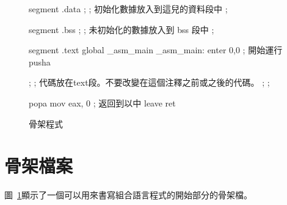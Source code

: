 \begin{figure}[t]
\begin{AsmCodeListing}[label=skel.asm]
segment .data
;
; 初始化數據放入到這兒的資料段中
;

segment .bss
;
; 未初始化的數據放入到 bss 段中
;

segment .text
        global  _asm_main
_asm_main:
        enter   0,0               ; 開始運行
        pusha

;
; 代碼放在text段。不要改變在這個注釋之前或之後的代碼。
;
;

        popa
        mov     eax, 0            ; 返回到以中
        leave
        ret
\end{AsmCodeListing}
\caption{骨架程式\label{fig:skel}}
\end{figure}

\section{骨架檔案 }

圖~\ref{fig:skel}顯示了一個可以用來書寫組合語言程式的開始部分的骨架檔。
